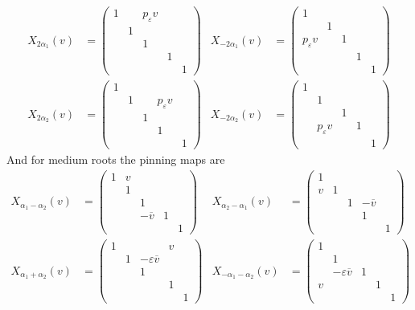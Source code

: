 \documentclass[12pt]{article}
\theoremstyle{definition}
\numberwithin{theorem}{subsection}
\newcommand{\eps}{\varepsilon}
\newcommand{\ov}{\overline}
\begin{document}
\begin{align*}
	X_{2\alpha_1}(v) &=
	\begin{pmatrix}
		1 && p_\eps v \\
		& 1 \\
		&& 1 \\
		&&& 1 \\
		&&&& 1
	\end{pmatrix} &
	X_{-2\alpha_1}(v) &=
	\begin{pmatrix}
		1 \\
		& 1 \\
		p_\eps v && 1 \\
		&&& 1 \\
		&&&& 1
	\end{pmatrix} \\[2ex]
	X_{2\alpha_2}(v) &=
	\begin{pmatrix}
		1 \\
		& 1 && p_\eps v \\
		&& 1 \\
		&&& 1 \\
		&&&& 1
	\end{pmatrix} &
	X_{-2\alpha_2}(v) &=
	\begin{pmatrix}
		1 \\
		& 1 \\
		&& 1 \\
		& p_\eps v && 1 \\
		&&&& 1
	\end{pmatrix}
\end{align*}
And for medium roots the pinning maps are
\begin{align*}
	X_{\alpha_1 - \alpha_2}(v) &=
	\begin{pmatrix}
		1 & v \\
		& 1 \\
		&& 1 \\
		&& - \ov v & 1 \\
		&&&& 1
	\end{pmatrix}
	 &
	X_{\alpha_2 - \alpha_1}(v) &=
	\begin{pmatrix}
		1 \\
		v & 1 && \\
		&& 1 & - \ov v \\
		&&& 1 \\
		&&&& 1
	\end{pmatrix} \\[2ex]
	X_{\alpha_1 + \alpha_2}(v) &= 
		\begin{pmatrix}
		1 &&& v \\
		& 1 & - \eps \ov v \\
		&& 1 \\
		&&& 1 \\
		&&&& 1
	\end{pmatrix} 
	&
	X_{-\alpha_1 - \alpha_2}(v) &=
	\begin{pmatrix}
		1 \\
		& 1 \\
		& - \eps \ov v & 1 \\
		v &&& 1 \\
		&&&& 1
	\end{pmatrix} 
\end{align*}
\end{document}
